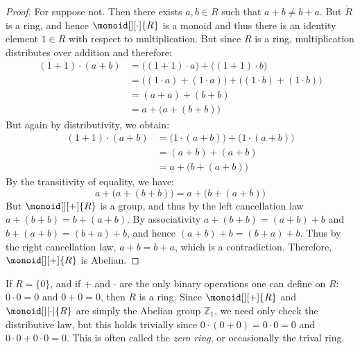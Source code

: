     \begin{proof}
        For suppose not. Then there exists $a,b\in{R}$ such that
        $a+b\ne{b}+a$. But $\ring{R}$ is a ring, and hence
        $\monoid[][\cdot]{R}$ is a monoid and thus there is an identity
        element $1\in{R}$ with respect to multiplication. But since $R$ is a
        ring, multiplication distributes over addition and therefore:
        \begin{align}
            (1+1)\cdot(a+b)
                &=\big((1+1)\cdot{a}\big)+\big((1+1)\cdot{b}\big)
                \tag{Left Distributive Law}\\
                &=\big((1\cdot{a})+(1\cdot{a})\big)+
                    \big((1\cdot{b})+(1\cdot{b})\big)
                \tag{Right Distributive Law}\\
                &=(a+a)+(b+b)
                    \tag{Multiplicative Identity}\\
                &=a+\big(a+(b+b)\big)
                    \tag{Associative Law}
        \end{align}
        But again by distributivity, we obtain:
        \begin{align}
            (1+1)\cdot(a+b)
            &=\big(1\cdot(a+b)\big)+\big(1\cdot(a+b)\big)
            \tag{Right Distributive Law}\\
            &=(a+b)+(a+b)
                \tag{Multiplicative Identity}\\
            &=a+\big(b+(a+b)\big)
                \tag{Associative Law}
        \end{align}
        By the transitivity of equality, we have:
        \begin{equation}
            a+\big(a+(b+b)\big)=a+\big(b+(a+b)\big)
        \end{equation}
        But $\monoid[][+]{R}$ is a group, and thus by the left cancellation
        law $a+(b+b)=b+(a+b)$. By associativity $a+(b+b)=(a+b)+b$ and
        $b+(a+b)=(b+a)+b$, and hence $(a+b)+b=(b+a)+b$. Thus by the right
        cancellation law, $a+b=b+a$, which is a contradiction. Therefore,
        $\monoid[][+]{R}$ is Abelian.
    \end{proof}
    \begin{example}
        If $R=\{0\}$, and if $+$ and $\cdot$ are the only binary operations
        one can define on $R$: $0\cdot{0}=0$ and $0+0=0$, then
        $\ring{R}$ is a ring. Since $\monoid[][+]{R}$ and
        $\monoid[][\cdot]{R}$ are simply the Abelian group $\mathbb{Z}_{1}$,
        we need only check the distributive law, but this holds trivially
        since $0\cdot(0+0)=0\cdot{0}=0$ and $0\cdot{0}+0\cdot{0}=0$. This is
        often called the \textit{zero ring}, or occasionally the trival
        ring.
    \end{example}
